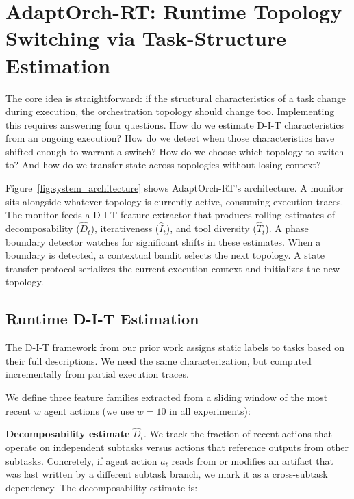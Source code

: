 \section{AdaptOrch-RT: Runtime Topology Switching via Task-Structure
Estimation}\label{adaptorch-rt-runtime-topology-switching-via-task-structure-estimation}

The core idea is straightforward: if the structural characteristics of a
task change during execution, the orchestration topology should change
too. Implementing this requires answering four questions. How do we
estimate D-I-T characteristics from an ongoing execution? How do we
detect when those characteristics have shifted enough to warrant a
switch? How do we choose which topology to switch to? And how do we
transfer state across topologies without losing context?

Figure~\ref{fig:system_architecture} shows
AdaptOrch-RT's architecture. A monitor sits alongside whatever topology
is currently active, consuming execution traces. The monitor feeds a
D-I-T feature extractor that produces rolling estimates of
decomposability (\(\hat{D}_t\)), iterativeness (\(\hat{I}_t\)), and tool
diversity (\(\hat{T}_t\)). A phase boundary detector watches for
significant shifts in these estimates. When a boundary is detected, a
contextual bandit selects the next topology. A state transfer protocol
serializes the current execution context and initializes the new
topology.

\subsection{Runtime D-I-T Estimation}\label{runtime-d-i-t-estimation}

The D-I-T framework from our prior work \citep{anonymous_2026} assigns
static labels to tasks based on their full descriptions. We need the
same characterization, but computed incrementally from partial execution
traces.

We define three feature families extracted from a sliding window of the
most recent \(w\) agent actions (we use \(w = 10\) in all experiments):

\textbf{Decomposability estimate} \(\hat{D}_t\). We track the fraction
of recent actions that operate on independent subtasks versus actions
that reference outputs from other subtasks. Concretely, if agent action
\(a_t\) reads from or modifies an artifact that was last written by a
different subtask branch, we mark it as a cross-subtask dependency. The
decomposability estimate is:

